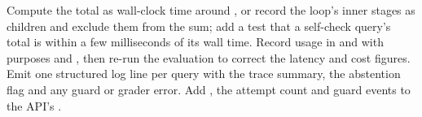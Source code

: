 \begin{recommended}
Compute the total as wall-clock time around , or record the loop's inner stages as children and exclude them from the sum; add a test that a self-check query's total is within a few milliseconds of its wall time. Record usage in  and  with purposes  and , then re-run the evaluation to correct the latency and cost figures. Emit one structured log line per query with the trace summary, the abstention flag and any guard or grader error. Add , the attempt count and guard events to the API's .
\end{recommended}
